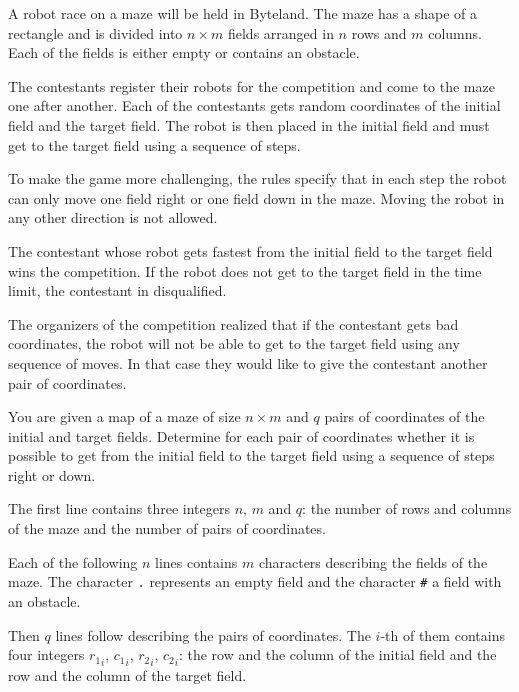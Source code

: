 





A robot race on a maze will be held in Byteland. The maze has a shape of
a rectangle and is divided into $n \times m$ fields arranged in $n$ rows and $m$
columns. Each of the fields is either empty or contains an obstacle.

The contestants register their robots for the competition and come to the maze
one after another. Each of the contestants gets random coordinates of the
initial field and the target field. The robot is then placed in the initial
field and must get to the target field using a sequence of steps.

To make the game more challenging, the rules specify that in each step the robot
can only move one field right or one field down in the maze. Moving the robot in
any other direction is not allowed.

The contestant whose robot gets fastest from the initial field to the target
field wins the competition. If the robot does not get to the target field in the
time limit, the contestant in disqualified.

The organizers of the competition realized that if the contestant gets bad
coordinates, the robot will not be able to get to the target field using any
sequence of moves. In that case they would like to give the contestant another
pair of coordinates.


You are given a map of a maze of size $n \times m$ and $q$ pairs of coordinates
of the initial and target fields. Determine for each pair of coordinates whether
it is possible to get from the initial field to the target field using
a sequence of steps right or down.


The first line contains three integers $n$, $m$ and $q$: the number of rows and
columns of the maze and the number of pairs of coordinates.

Each of the following $n$ lines contains $m$ characters describing the fields of
the maze. The character \texttt{.} represents an empty field and the character
\texttt{\#} a field with an obstacle.

Then $q$ lines follow describing the pairs of coordinates. The $i$-th of them
contains four integers ${r_1}_i$, ${c_1}_i$, ${r_2}_i$, ${c_2}_i$: the row and
the column of the initial field and the row and the column of the target field.

